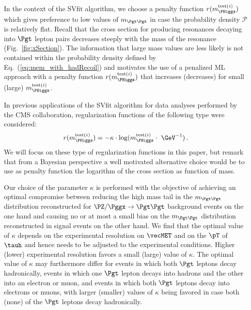 In the context of the SVfit algorithm, we choose a penalty function $r(m_{\PHiggs}^{\textrm{test}(i)})$
which gives preference to low values of $m_{\Pgt\Pgt}$ 
in case the probability density $\mathcal{P}$ 
is relatively flat.
Recall that the cross section for producing resonances decaying into $\Pgt$ lepton pairs 
decreases steeply with the mass of the resonance (\cf Fig.~\ref{fig:xSection}).
The information that large mass values are less likely is not contained within the probability density defined by Eq.~(\ref{eq:mem_with_hadRecoil})
and motivates the use of a penalized ML approach with a penalty function $r(m_{\PHiggs}^{\textrm{test}(i)})$ 
that increases (decreases) for small (large) $m_{\PHiggs}^{\textrm{test}(i)}$.

In previous applications of the SVfit algorithm for data analyses performed by the CMS collaboration,
regularization functions of the following type were considered:
\begin{equation} 
r(m_{\PHiggs}^{\textrm{test}(i)}) = -\kappa \cdot \log(m_{\PHiggs}^{\textrm{test}(i)} \cdot \mbox{~\GeV}^{-1}) \, .
\label{eq:logM}
\end{equation}
We will focus on these type of regularization functions in this paper,
but remark that from a Bayesian perspective a well motivated alternative choice 
would be to use as penalty function the logarithm of the cross section as function of mass.

Our choice of the parameter $\kappa$ is performed with the objective of achieving an
optimal compromise between reducing the high mass tail in the $m_{\Pgt\Pgt}$ distribution reconstructed for 
$\PZ/\Pggx \to \Pgt\Pgt$ background events on the one hand and 
causing no or at most a small bias on the $m_{\Pgt\Pgt}$ distribution
reconstructed in signal events on the other hand.
We find that the optimal value of $\kappa$ depends on the experimental
resolution on $\vecMET$ and on the $\pT$ of $\tauh$ and hence needs to be adjusted to the experimental conditions.
Higher (lower) experimental resolution favors a small (large) value of $\kappa$. 
The optimal value of $\kappa$ may furthermore differ 
for events in which both $\Pgt$ leptons decay hadronically,
events in which one $\Pgt$ lepton decays into hadrons and the other into an electron or muon,
and events in which both $\Pgt$ leptons decay into electrons or muons,
with larger (smaller) values of $\kappa$ being favored in case both (none) of the $\Pgt$ leptons decay hadronically.

